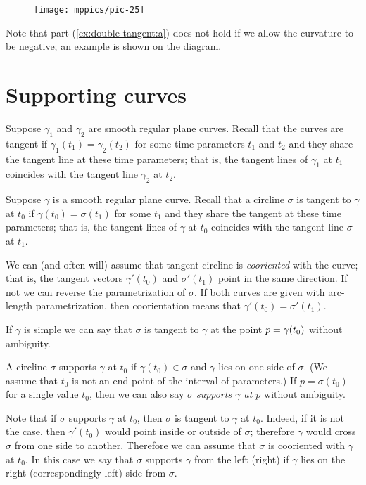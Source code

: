 {

\begin{wrapfigure}{o}{35 mm}
\vskip-4mm
\centering
\texttt{[image: mppics/pic-25]}
\vskip0mm
\end{wrapfigure}

Note that part (\ref{ex:double-tangent:a}) does not hold if we allow the curvature to be negative; an example is shown on the diagram.

}

\section*{Supporting curves}

Suppose $\gamma_1$ and $\gamma_2$ are smooth regular plane curves.
Recall that the curves are tangent if $\gamma_1(t_1)=\gamma_2(t_2)$ for some time parameters $t_1$ and $t_2$
and they share the tangent line at these time parameters;
that is, the tangent lines of $\gamma_1$ at $t_1$ coincides with the tangent line $\gamma_2$ at $t_2$.

Suppose $\gamma$ is a smooth regular plane curve.
Recall that a circline $\sigma$ is tangent to $\gamma$ at $t_0$ if
$\gamma(t_0)=\sigma(t_1)$ for some $t_1$ and they share the tangent at these time parameters;
that is, the tangent lines of $\gamma$ at $t_0$ coincides with the tangent line $\sigma$ at $t_1$.

We can (and often will) assume that tangent circline is \emph{cooriented} with the curve;
that is, the tangent vectors $\gamma'(t_0)$ and $\sigma'(t_1)$ point in the same direction.
If not we can reverse the parametrization of $\sigma$.
If both curves are given with arc-length parametrization, then coorientation  means that $\gamma'(t_0)=\sigma'(t_1)$.

If $\gamma$ is simple we can say that $\sigma$ is tangent to $\gamma$ at the point $p\z=\gamma(t_0)$ without ambiguity.


A circline $\sigma$ supports $\gamma$ at $t_0$ if $\gamma(t_0)\in\sigma$
and $\gamma$ lies on one side of $\sigma$.
(We assume that $t_0$ is not an end point of the interval of parameters.)
If $p=\sigma(t_0)$ for a single value $t_0$,
then we can also say \emph{$\sigma$ supports $\gamma$ at $p$} without ambiguity.

Note that if $\sigma$ supports $\gamma$ at $t_0$, then $\sigma$ is tangent to $\gamma$ at $t_0$.
Indeed, if it is not the case, then $\gamma'(t_0)$ would point inside or outside of $\sigma$;
therefore $\gamma$ would cross $\sigma$ from one side to another.
Therefore we can assume that $\sigma$ is cooriented with $\gamma$  at $t_0$.
In this case we say that $\sigma$ supports $\gamma$ from the left (right) if $\gamma$ lies on the right (correspondingly left) side from $\sigma$. 


